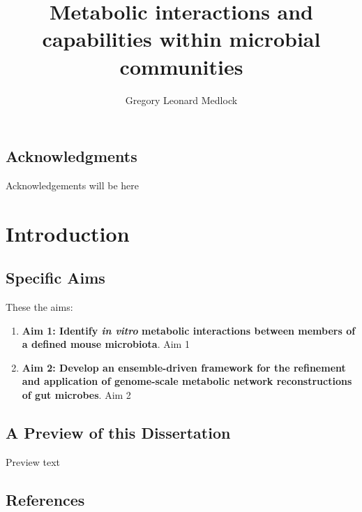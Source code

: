 \documentclass[11pt,twocolumn,notitlepage,openany,twoside]{book}
\title{Metabolic interactions and capabilities within microbial communities}
\author{Gregory Leonard Medlock}
\begin{document}
\frontmatter

\begingroup
\let\clearpage

\tableofcontents
\hspace{1.5cm}
\listoffigures
\hspace{1.5cm}
\listoftables

\endgroup

\clearpage
{}
\section*{Acknowledgments}

Acknowledgements will be here

\mainmatter


\chapter{Introduction}
\begin{refsection}

\section{Specific Aims}

These the aims:

\begin{enumerate}
  \item \textbf{Aim 1: Identify \textit{in vitro} metabolic interactions between members of a defined mouse microbiota}. Aim 1
  \item \textbf{Aim 2: Develop an ensemble-driven framework for the refinement and application of genome-scale metabolic network reconstructions of gut microbes}. Aim 2
\end{enumerate}



\section{A Preview of this Dissertation}

Preview text\cite{Song2005-mt}
\section{References}

\printbibliography[heading=none]
\end{refsection}
\end{document}
